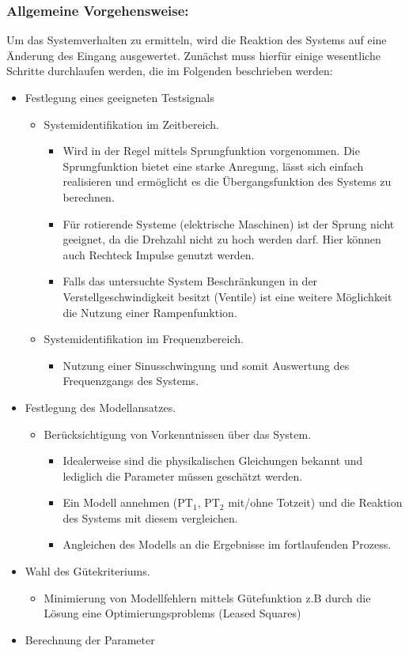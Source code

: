 \subsubsection{Allgemeine Vorgehensweise:}
%
Um das Systemverhalten zu ermitteln, wird die Reaktion des Systems auf eine Änderung des Eingang ausgewertet. Zunächst muss hierfür einige wesentliche Schritte durchlaufen werden, die im Folgenden beschrieben werden:
%
\begin{itemize}
%
\item Festlegung eines geeigneten Testsignals
%
	\begin{itemize}
	\item Systemidentifikation im Zeitbereich.
		\begin{itemize}
		\item Wird in der Regel mittels Sprungfunktion vorgenommen. Die Sprungfunktion bietet eine starke Anregung, lässt sich einfach realisieren und ermöglicht es die Übergangsfunktion des Systems zu berechnen.
		\item Für rotierende Systeme (elektrische Maschinen) ist der Sprung nicht geeignet, da die Drehzahl nicht zu hoch werden darf. Hier können auch Rechteck Impulse genutzt werden.
		\item Falls das untersuchte System Beschränkungen in der Verstellgeschwindigkeit besitzt (Ventile) ist eine weitere Möglichkeit die Nutzung einer Rampenfunktion. 
		\end{itemize}
	\item Systemidentifikation im Frequenzbereich.
		\begin{itemize}
		\item Nutzung einer Sinusschwingung und somit Auswertung des Frequenzgangs des Systems. 
		\end{itemize}
	\end{itemize}
%
\item Festlegung des Modellansatzes.
%
	\begin{itemize}
		\item Berücksichtigung von Vorkenntnissen über das System.
		\begin{itemize}
			\item Idealerweise sind die physikalischen Gleichungen bekannt und lediglich die Parameter müssen geschätzt werden.
			\item Ein Modell annehmen ($\text{PT}_{1}$, $\text{PT}_{2}$ mit/ohne Totzeit) und die Reaktion des Systems mit diesem vergleichen.
			\item Angleichen des Modells an die Ergebnisse im fortlaufenden Prozess.
		\end{itemize}
	\end{itemize}
%
\item Wahl des Gütekriteriums.
%
	\begin{itemize}
	\item Minimierung von Modellfehlern mittels Gütefunktion z.B durch die Lösung eine Optimierungsproblems (Leased Squares)
	\end{itemize}
%
\item Berechnung der Parameter
%
\end{itemize}
